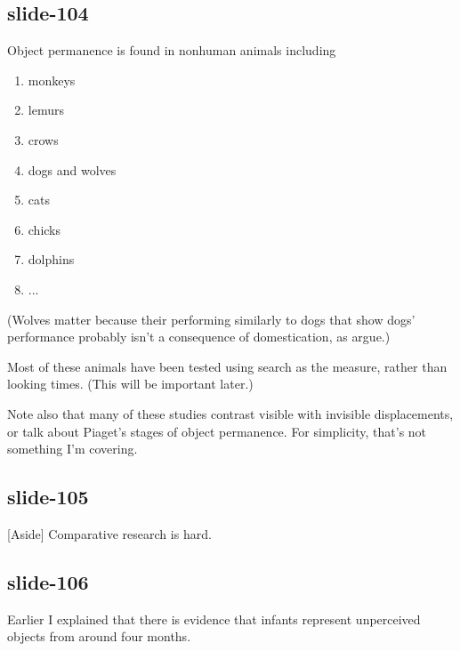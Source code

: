 \documentclass[12pt,\papersize]{extarticle}
\begin{document}
\subsection{slide-104}
Object permanence is found in nonhuman animals including
 
\begin{enumerate}
 
\item monkeys \citep{santos:2006_cotton-top}
 
\item lemurs \citep{deppe:2009_object}
 
\item crows \citep{hoffmann:2011_ontogeny}
 
\item dogs and wolves \citep{fiset:2013_object}
 
\item cats \citep{triana:1981_object}
 
\item chicks \citep{chiandetti:2011_chicks_op}
 
\item dolphins \citep{jaakkola:2010_what}
 
\item ...
 
\end{enumerate}
 
(Wolves matter because their performing similarly to dogs that show dogs' performance probably isn't a consequence of domestication, as \citet{fiset:2013_object} argue.)
 
Most of these animals have been tested using search as the measure, rather than looking times.
               (This will be important later.)
 
 
 
Note also that many of these studies contrast visible with invisible displacements, or talk about Piaget's stages of object permanence.  For simplicity, that's not something I'm covering.
 
\subsection{slide-105}
[Aside] Comparative research is hard.
 
\subsection{slide-106}
Earlier I explained that there is evidence that infants represent unperceived objects from around four months.
 
\end{document}
